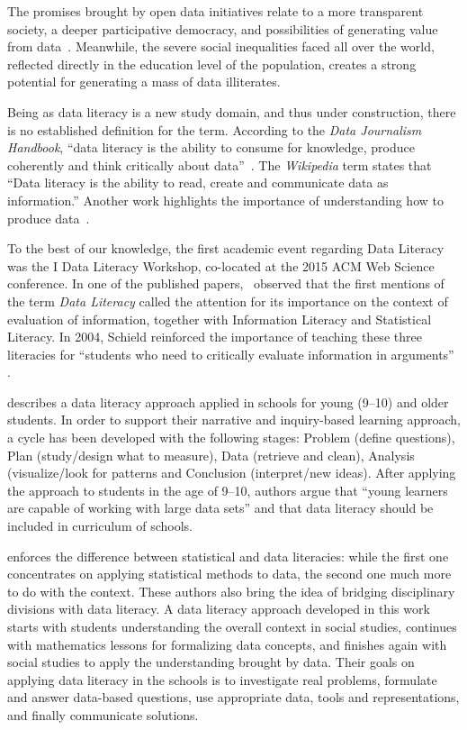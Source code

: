 The promises brought by open data initiatives relate to a more transparent society, a deeper participative democracy, and possibilities of generating value from data~\cite{Huijboom2011}.
Meanwhile, the severe social inequalities faced all over the world, reflected directly in the education level of the population, creates a strong potential for generating a mass of data illiterates.

Being as data literacy is a new study domain, and thus under construction, there is no established definition for the term. According to the \emph{Data Journalism Handbook}, “data literacy is the ability to consume for knowledge, produce coherently and think critically about data”~\cite{Grey2012}. The \emph{Wikipedia} term states that “Data literacy is the ability to read, create and communicate data as information.” Another work highlights the importance of understanding how to produce data~\cite{Carlson2011}.

To the best of our knowledge, the first academic event regarding Data Literacy was the I Data Literacy Workshop, co-located at the 2015 ACM Web Science conference.
In one of the published papers,~ observed that the first mentions of the term \emph{Data Literacy} called the attention for its importance on the context of evaluation of information, together with  Information Literacy and Statistical Literacy. 
In 2004, Schield reinforced the importance of teaching these three literacies for ``students who need to critically evaluate information in arguments'' \cite{Schield2004}.

 describes a data literacy approach applied in schools for young (9--10) and older students.
In order to support their narrative and inquiry-based learning approach, a cycle has been developed with the following stages: Problem (define questions), Plan (study/design what to measure), Data (retrieve and clean), Analysis (visualize/look for patterns and Conclusion (interpret/new ideas).
After applying the approach to students in the age of 9--10, authors argue that ``young learners are capable of working with large data sets'' and that data literacy should be included in curriculum of schools.


 enforces the difference between statistical and data literacies: while the first one concentrates on applying statistical methods to data, the second one much more to do with the context.
These authors also bring the idea of bridging disciplinary divisions with data literacy.
A data literacy approach developed in this work starts with students understanding the overall context in social studies, continues with mathematics lessons for formalizing data concepts, and finishes again with social studies to apply the understanding brought by data.
Their goals on applying data literacy in the schools is to investigate real problems, formulate and answer data-based questions, use appropriate data, tools and representations, and finally communicate solutions.

